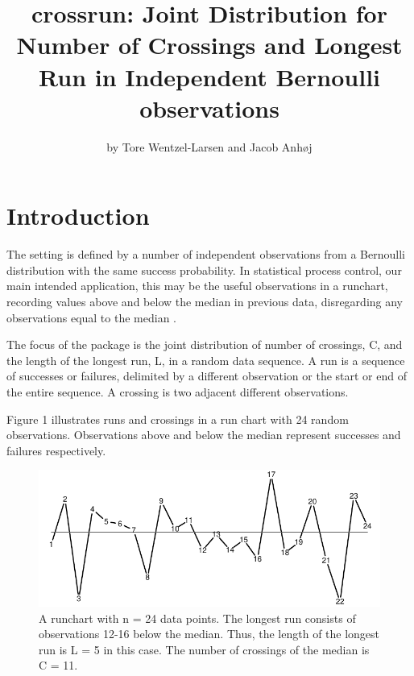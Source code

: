 \title{crossrun: Joint Distribution for Number of Crossings and Longest Run in Independent Bernoulli observations}
\author{by Tore Wentzel-Larsen and Jacob Anh{\o}j}

\maketitle


\section{Introduction}

The setting is defined by a number of independent observations from a Bernoulli distribution with the same success probability. In statistical process control, our main intended application, this may be the useful observations in a runchart, recording values above and below the median in previous data, disregarding any observations equal to the median \citep{Anhoej:2015}. 

The focus of the  package is the joint distribution of number of crossings, C, and the length of the longest run, L, in a random data sequence. A run is a sequence of successes or failures, delimited by a different observation or the start or end of the entire sequence. A crossing is two adjacent different observations. 

Figure 1 illustrates runs and crossings in a run chart with 24 random observations. Observations above and below the median represent successes and failures respectively.

\begin{figure}[htbp]
  \centering
  \caption{A runchart with n = 24 data points. The longest run consists of observations 12-16 below the median. Thus, the length of the longest run is L = 5 in this case. The number of crossings of the median is C = 11.}
  \label{figure:runchart}
  \includegraphics{fig1}
\end{figure}

